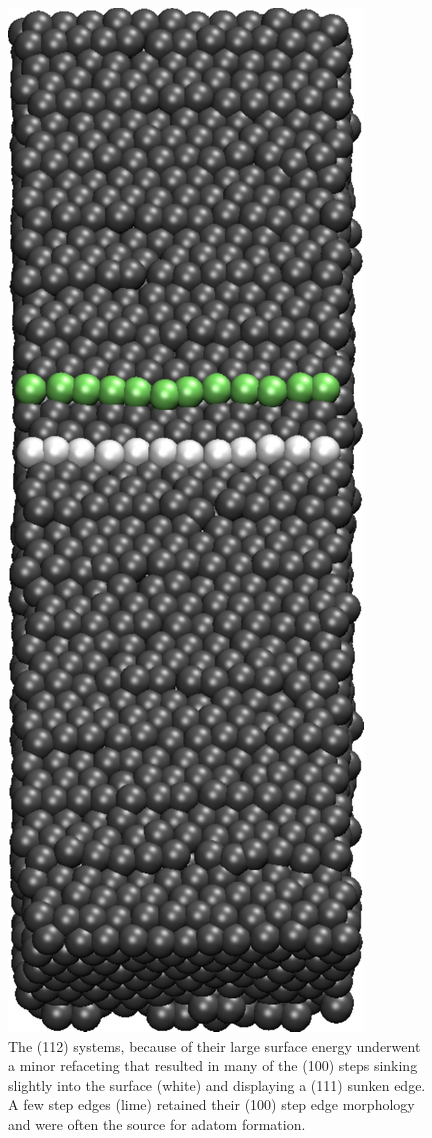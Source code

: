 \begin{figure}
\centering
\includegraphics[width=0.4\linewidth]{../figures/appB/112_sunken.pdf}
\caption{The (112) systems, because of their large surface energy underwent a
minor refaceting that resulted in many of the (100) steps sinking slightly into
the surface (white) and displaying a (111) sunken edge. A few step edges (lime)
retained their (100) step edge morphology and were often the source for adatom
formation.}
\label{fig:112sunken}
\end{figure}
\newpage



